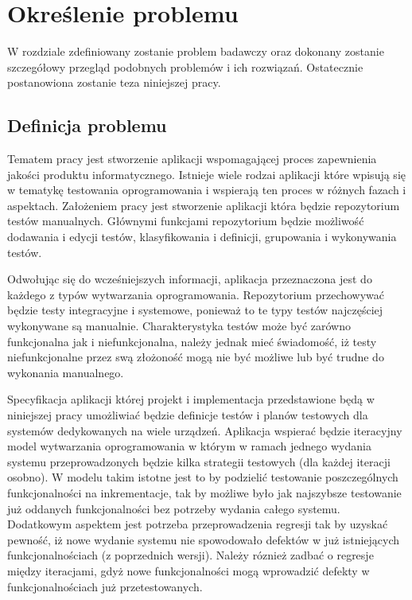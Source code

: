 \chapter{Określenie problemu} 
\label{cha:okreslenie_problemu}

W rozdziale zdefiniowany zostanie problem badawczy oraz dokonany zostanie szczegółowy przegląd  podobnych problemów i ich rozwiązań. Ostatecznie postanowiona zostanie teza niniejszej pracy.

\section{Definicja problemu} 
\label{sec:definicja_problemu}

Tematem pracy jest stworzenie aplikacji wspomagającej proces zapewnienia jakości produktu informatycznego. Istnieje wiele rodzai aplikacji które wpisują się w tematykę testowania oprogramowania i wspierają ten proces w różnych fazach i aspektach. Założeniem pracy jest stworzenie aplikacji która będzie repozytorium testów manualnych. Głównymi funkcjami repozytorium będzie możliwość dodawania i edycji testów, klasyfikowania i definicji, grupowania i wykonywania  testów.


Odwołując się do wcześniejszych informacji, aplikacja przeznaczona jest do każdego z typów wytwarzania oprogramowania. Repozytorium przechowywać będzie testy integracyjne i systemowe, ponieważ to te typy testów najczęściej wykonywane są manualnie. Charakterystyka testów może być zarówno funkcjonalna jak i niefunkcjonalna, należy jednak mieć świadomość, iż testy niefunkcjonalne przez swą złożoność mogą nie być możliwe lub być trudne do wykonania manualnego.

Specyfikacja aplikacji której projekt i implementacja przedstawione będą w niniejszej pracy umożliwiać będzie definicje testów i planów testowych dla systemów dedykowanych na wiele urządzeń. Aplikacja wspierać będzie iteracyjny model wytwarzania oprogramowania w którym w ramach jednego wydania systemu przeprowadzonych będzie kilka strategii testowych (dla każdej iteracji osobno). W modelu takim istotne jest to by podzielić testowanie poszczególnych funkcjonalności na inkrementacje, tak by możliwe było jak najszybsze testowanie już oddanych funkcjonalności bez potrzeby wydania całego systemu. Dodatkowym aspektem jest potrzeba przeprowadzenia regresji tak by uzyskać pewność, iż nowe wydanie systemu nie spowodowało defektów w już istniejących funkcjonalnościach (z poprzednich wersji). Należy róznież zadbać o regresje między iteracjami, gdyż nowe funkcjonalności mogą wprowadzić defekty w funkcjonalnościach już przetestowanych.

